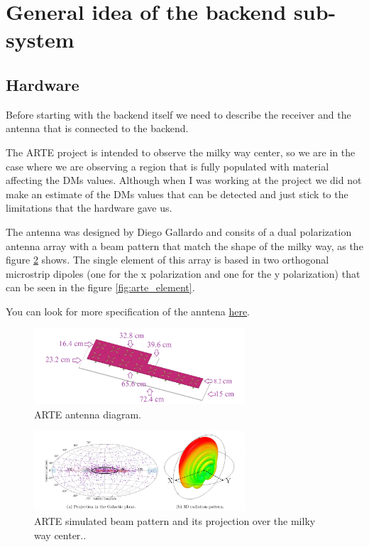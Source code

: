 \section{General idea of the backend sub-system}

\subsection{Hardware}
Before starting with the backend itself we need to describe the receiver and the antenna that is connected to the backend.


The ARTE project is intended to observe the milky way center, so we are in the case where we are observing a region that is fully populated with material affecting the DMs values. Although when I was working at the project we did not make an estimate of the DMs values that can be detected and just stick to the limitations that the hardware gave us. 


The antenna was designed by Diego Gallardo and consits of a dual polarization antenna array with a beam pattern that match the shape of the milky way, as the figure \ref{fig:arte_beam} shows. The single element of this array is based in two orthogonal microstrip dipoles (one for the x polarization and one for the y polarization) that can be seen in the figure \ref{fig:arte_element}.


You can look for more specification of the anntena \href{http://www.das.uchile.cl/lab_mwl/publicaciones/Articles/gallardo-et-al-2024-an-ultra-wideband-dual-polarization-antenna-array-for-the-detection-and-localization-of-bright-fast.pdf}{here}.

\begin{figure}
    \centering
    \includegraphics[width=0.7\textwidth]{images/arte_antenna.png}
    \caption{ARTE antenna diagram.}
    \label{fig:arte_array}
\end{figure}


\begin{figure}
    \centering
    \includegraphics[width=0.7\textwidth]{images/arte_beam.png}
    \caption{ARTE simulated beam pattern and its projection over the milky way center..}
    \label{fig:arte_beam}
\end{figure}


